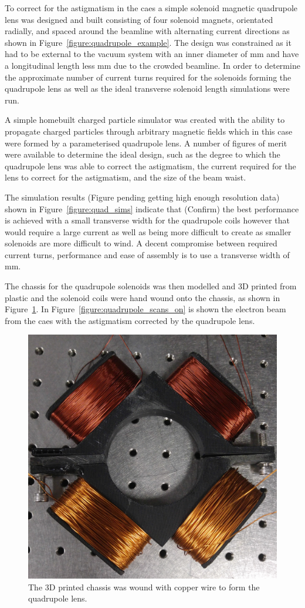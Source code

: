 To correct for the astigmatism in the \gls{caes} a simple solenoid magnetic quadrupole lens was designed and built consisting of four solenoid magnets, orientated radially, and spaced around the beamline with alternating current directions as shown in Figure~\ref{figure:quadrupole_example}.
The design was constrained as it had to be external to the vacuum system with an inner diameter of \unit[70]{mm} and have a longitudinal length less \unit[20]{mm} due to the crowded beamline.
In order to determine the approximate number of current turns required for the solenoids forming the quadrupole lens as well as the ideal transverse solenoid length simulations were run.

A simple homebuilt charged particle simulator was created with the ability to propagate charged particles through arbitrary magnetic fields which in this case were formed by a parameterised quadrupole lens.
A number of figures of merit were available to determine the ideal design, such as the degree to which the quadrupole lens was able to correct the astigmatism, the current required for the lens to correct for the astigmatism, and the size of the beam waist.

The simulation results {\color{red}(Figure pending getting high enough resolution data)} shown in Figure~\ref{figure:quad_sims} indicate that {\color{red}(Confirm)} the best performance is achieved with a small transverse width for the quadrupole coils however that would require a large current as well as being more difficult to create as smaller solenoids are more difficult to wind.
A decent compromise between required current turns, performance and ease of assembly is to use a transverse width of \unit[70]{mm}.

The chassis for the quadrupole solenoids was then modelled and 3D printed from plastic and the solenoid coils were hand wound onto the chassis, as shown in Figure~\ref{figure:quadrupole}.
In Figure~\ref{figure:quadrupole_scans_on} is shown the electron beam from the \gls{caes} with the astigmatism corrected by the quadrupole lens.

\begin{figure}
    \centering
    \includegraphics[width=0.5\linewidth]{part2/Figs/quadrupole.jpg}
    \caption{The 3D printed chassis was wound with copper wire to form the quadrupole lens.}
    \label{figure:quadrupole}
\end{figure}


